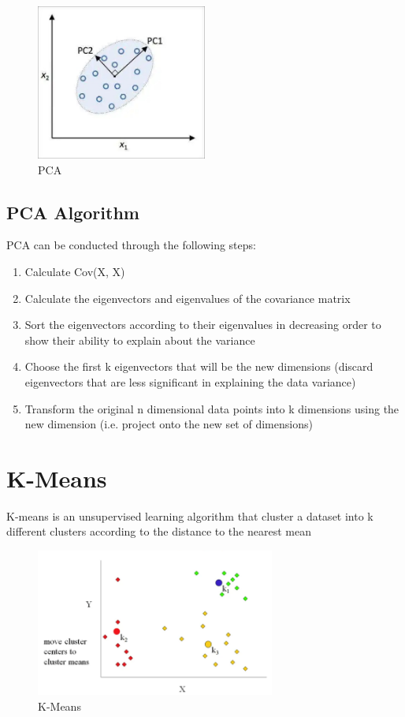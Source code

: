 \documentclass[12pt]{article}
\begin{document}
\begin{figure}[htbp]
\begin{center}
\includegraphics[width = 0.5\textwidth]{Images/PCA.jpeg}
\caption{PCA}
\label{default}
\end{center}
\end{figure}

\subsection{PCA Algorithm}
PCA can be conducted through the following steps:
\begin{enumerate}
	\item Calculate Cov(X, X)
	\item Calculate the eigenvectors and eigenvalues of the covariance matrix
	\item Sort the eigenvectors according to their eigenvalues in decreasing order to show their ability to explain about the variance
	\item Choose the first k eigenvectors that will be the new dimensions (discard eigenvectors that are less significant in explaining the data variance)
	\item Transform the original n dimensional data points into k dimensions using the new dimension (i.e. project onto the new set of dimensions)
\end{enumerate}
\newpage

\section{K-Means}
K-means is an unsupervised learning algorithm that cluster a dataset into k different clusters according to the distance to the nearest mean

\begin{figure}[htbp]
\begin{center}
\includegraphics[width = 0.7\textwidth]{Images/K-Means.png}
\caption{K-Means}
\label{default}
\end{center}
\end{figure}
\end{document}
